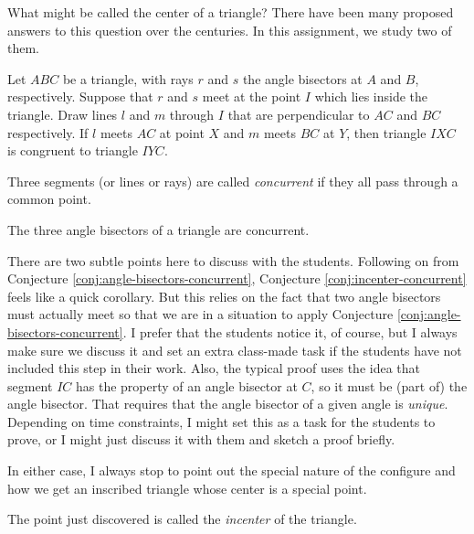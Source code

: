 What might be called the center of a triangle? There have been many proposed answers to this question over the centuries. In this assignment, we study two of them.

\begin{conjecture}\label{conj:angle-bisectors-concurrent}
Let $ABC$ be a triangle, with rays $r$ and $s$ the angle bisectors at $A$ and $B$, respectively. Suppose that $r$ and $s$ meet at the point $I$ which lies inside the triangle. Draw lines $l$ and $m$ through $I$ that are perpendicular to $AC$ and $BC$ respectively. If $l$ meets $AC$ at point $X$ and $m$ meets $BC$ at $Y$, then triangle $IXC$ is congruent to triangle $IYC$.
\end{conjecture}


\begin{definition}\label{defn:concurrent}
Three segments (or lines or rays) are called \emph{concurrent} if they all pass through a common point.
\end{definition}

\begin{conjecture}\label{conj:incenter-concurrent}
The three angle bisectors of a triangle are concurrent.
\end{conjecture}

\begin{annotation}
{
\color{blue}
There are two subtle points here to discuss with the students. Following on from Conjecture \ref{conj:angle-bisectors-concurrent}, Conjecture \ref{conj:incenter-concurrent} feels like a quick corollary. But this relies on
the fact that two angle bisectors must actually meet so that we are in a situation to apply Conjecture \ref{conj:angle-bisectors-concurrent}. I prefer that the students notice it, of course, but I always make sure we discuss it and set an extra class-made task if the students have not included this step in their work. Also, the typical proof uses the idea that segment $IC$ has the property of an angle bisector at $C$, so it must be (part of) the angle bisector. That requires that the angle bisector of a given angle is \emph{unique}. Depending on time constraints, I might set this as a task for the students to prove, or I might just discuss it with them and sketch a proof briefly.

In either case, I always stop to point out the special nature of the configure and how we get an inscribed triangle whose center is a special point.
}
\end{annotation}

\begin{definition}\label{defn:incenter}
The point just discovered is called the \emph{incenter} of the triangle.
\end{definition}

